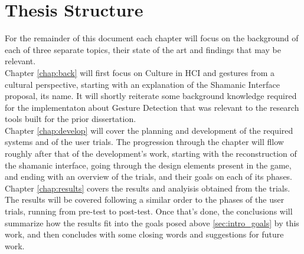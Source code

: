 \section{Thesis Structure} \label{sec:intro_structure}
    For the remainder of this document each chapter will focus on the background of each of three separate topics, their state of the art and findings that may be relevant.\\
    Chapter \ref{chap:back} will first focus on Culture in HCI and gestures from a cultural perspective, starting with an explanation of the Shamanic Interface proposal, its name. It will shortly reiterate some background knowledge required for the implementaton about Gesture Detection that was relevant to the research tools built for the prior dissertation.\\
    Chapter \ref{chap:develop} will cover the planning and development of the required systems and of the user trials. The progression through the chapter will fllow roughly after that of the development's work, starting with the reconstruction of the shamanic interface, going through the design elements present in the game, and ending with an overview of the trials, and their goals on each of its phases.\\
    Chapter \ref{chap:results} covers the results and analyisis obtained from the trials. The results will be covered following a similar order to the phases of the user trials, running from pre-test to post-test. Once that's done, the conclusions will summarize how the results fit into the goals posed above \ref{sec:intro_goals} by this work, and then concludes with some closing words and suggestions for future work.\\
    
